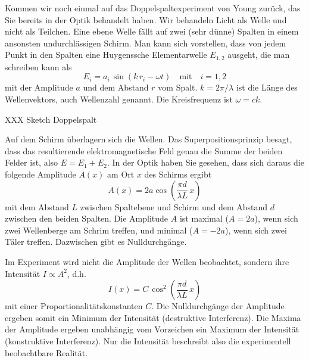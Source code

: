 Kommen wir noch einmal auf das Doppelspaltexperiment von Young zurück, das Sie bereits in der Optik behandelt haben. Wir behandeln Licht als Welle und nicht als Teilchen. Eine ebene Welle fällt auf zwei (sehr dünne) Spalten in einem ansonsten undurchlässigen Schirm. Man kann sich vorstellen, dass von jedem Punkt in den Spalten eine Huygenssche Elementarwelle $E_{1,2}$ ausgeht, die man schreiben kann als 
\begin{equation}
    E_{i} = a_i \, \sin ( k \, r_i - \omega t) \quad \text{mit} \quad i = 1,2
\end{equation}
mit der Amplitude $a$ und dem Abstand $r$ vom Spalt. $k = 2 \pi / \lambda $ ist die Länge des Wellenvektors, auch Wellenzahl genannt.
Die Kreisfrequenz ist $\omega = c k$.


\begin{marginfigure}
    \caption{XXX Sketch Doppelspalt}
\end{marginfigure}


Auf dem Schirm überlagern sich die Wellen. Das Superpositionsprinzip besagt, dass das resultierende elektromagnetische Feld genau die Summe der beiden Felder ist, also $E = E_1 + E_2$. In der Optik haben Sie gesehen, dass sich daraus die folgende Amplitude $A(x)$ am Ort $x$ des Schirms ergibt
\begin{equation}
    A(x) = 2 a\cos \left( \frac{\pi d}{\lambda L} \, x \right)
\end{equation}
mit dem Abstand $L$ zwischen Spaltebene und Schirm und dem Abstand $d$ zwischen den beiden Spalten. Die Amplitude $A$ ist maximal ($A = 2a$), wenn sich zwei Wellenberge am Schrim treffen, und minimal ($A = -2 a$), wenn sich zwei Täler treffen.  Dazwischen gibt es Nulldurchgänge. 

Im Experiment wird nicht die Amplitude der Wellen beobachtet, sondern ihre Intensität $I \propto A^2$, d.h.
\begin{equation}
    I(x) = C \, \cos^2 \left( \frac{\pi d}{\lambda L} \, x \right)
\end{equation}
mit einer Proportionalitätskonstanten $C$. Die Nulldurchgänge der Amplitude ergeben somit ein Minimum der Intensität (destruktive Interferenz). Die Maxima der Amplitude ergeben unabhängig vom Vorzeichen ein Maximum der Intensität (konstruktive Interferenz). Nur die Intensität beschreibt also die experimentell beobachtbare Realität.


